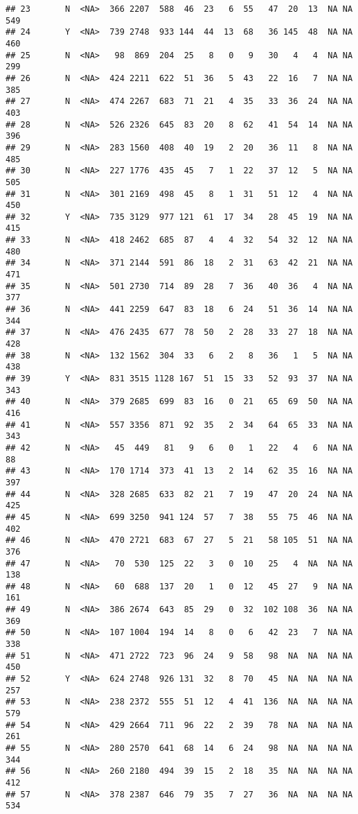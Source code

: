 \documentclass[]{article}
\begin{document}
\begin{verbatim}
## 23       N  <NA>  366 2207  588  46  23   6  55   47  20  13  NA NA  549
## 24       Y  <NA>  739 2748  933 144  44  13  68   36 145  48  NA NA  460
## 25       N  <NA>   98  869  204  25   8   0   9   30   4   4  NA NA  299
## 26       N  <NA>  424 2211  622  51  36   5  43   22  16   7  NA NA  385
## 27       N  <NA>  474 2267  683  71  21   4  35   33  36  24  NA NA  403
## 28       N  <NA>  526 2326  645  83  20   8  62   41  54  14  NA NA  396
## 29       N  <NA>  283 1560  408  40  19   2  20   36  11   8  NA NA  485
## 30       N  <NA>  227 1776  435  45   7   1  22   37  12   5  NA NA  505
## 31       N  <NA>  301 2169  498  45   8   1  31   51  12   4  NA NA  450
## 32       Y  <NA>  735 3129  977 121  61  17  34   28  45  19  NA NA  415
## 33       N  <NA>  418 2462  685  87   4   4  32   54  32  12  NA NA  480
## 34       N  <NA>  371 2144  591  86  18   2  31   63  42  21  NA NA  471
## 35       N  <NA>  501 2730  714  89  28   7  36   40  36   4  NA NA  377
## 36       N  <NA>  441 2259  647  83  18   6  24   51  36  14  NA NA  344
## 37       N  <NA>  476 2435  677  78  50   2  28   33  27  18  NA NA  428
## 38       N  <NA>  132 1562  304  33   6   2   8   36   1   5  NA NA  438
## 39       Y  <NA>  831 3515 1128 167  51  15  33   52  93  37  NA NA  343
## 40       N  <NA>  379 2685  699  83  16   0  21   65  69  50  NA NA  416
## 41       N  <NA>  557 3356  871  92  35   2  34   64  65  33  NA NA  343
## 42       N  <NA>   45  449   81   9   6   0   1   22   4   6  NA NA   88
## 43       N  <NA>  170 1714  373  41  13   2  14   62  35  16  NA NA  397
## 44       N  <NA>  328 2685  633  82  21   7  19   47  20  24  NA NA  425
## 45       N  <NA>  699 3250  941 124  57   7  38   55  75  46  NA NA  402
## 46       N  <NA>  470 2721  683  67  27   5  21   58 105  51  NA NA  376
## 47       N  <NA>   70  530  125  22   3   0  10   25   4  NA  NA NA  138
## 48       N  <NA>   60  688  137  20   1   0  12   45  27   9  NA NA  161
## 49       N  <NA>  386 2674  643  85  29   0  32  102 108  36  NA NA  369
## 50       N  <NA>  107 1004  194  14   8   0   6   42  23   7  NA NA  338
## 51       N  <NA>  471 2722  723  96  24   9  58   98  NA  NA  NA NA  450
## 52       Y  <NA>  624 2748  926 131  32   8  70   45  NA  NA  NA NA  257
## 53       N  <NA>  238 2372  555  51  12   4  41  136  NA  NA  NA NA  579
## 54       N  <NA>  429 2664  711  96  22   2  39   78  NA  NA  NA NA  261
## 55       N  <NA>  280 2570  641  68  14   6  24   98  NA  NA  NA NA  344
## 56       N  <NA>  260 2180  494  39  15   2  18   35  NA  NA  NA NA  412
## 57       N  <NA>  378 2387  646  79  35   7  27   36  NA  NA  NA NA  534

\end{verbatim}
\end{document}
